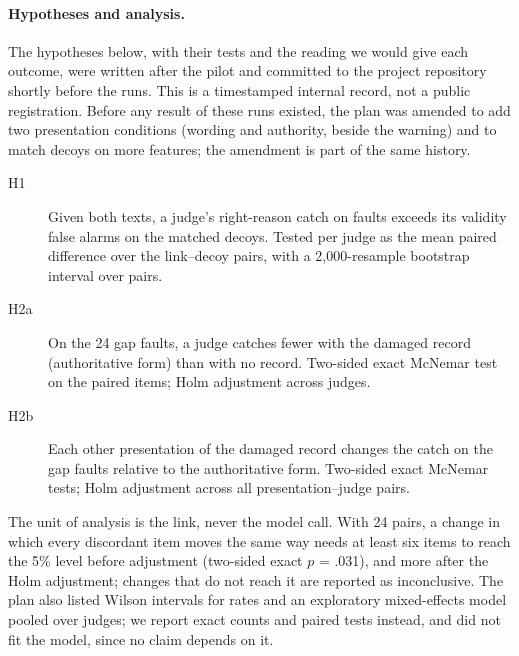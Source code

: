 \paragraph{Hypotheses and analysis.}
The hypotheses below, with their tests and the reading we would give each outcome, were written after the pilot and
committed to the project repository shortly before the runs. This is a timestamped internal record, not a public
registration. Before any result of these runs existed, the plan was amended to add two presentation conditions (wording and
authority, beside the warning) and to match decoys on more features; the amendment is part of the same history.
\begin{description}
  \item[H1] Given both texts, a judge's right-reason catch on faults exceeds its validity false alarms on the matched
  decoys. Tested per judge as the mean paired difference over the \ENLinks{} link--decoy pairs, with a 2,000-resample
  bootstrap interval over pairs.
  \item[H2a] On the 24 gap faults, a judge catches fewer with the damaged record (authoritative form) than with no
  record. Two-sided exact McNemar test on the paired items; Holm adjustment across judges.
  \item[H2b] Each other presentation of the damaged record changes the catch on the gap faults relative to the
  authoritative form. Two-sided exact McNemar tests; Holm adjustment across all \EHTwobTests{} presentation--judge
  pairs.
\end{description}
The unit of analysis is the link, never the model call. With 24 pairs, a change in which every discordant item
moves the same way needs at least six items to reach the 5\% level before adjustment (two-sided exact $p$ = .031), and
more after the Holm adjustment; changes that do not reach it are reported as inconclusive. The plan also listed Wilson
intervals for rates and an exploratory mixed-effects model pooled over judges; we report exact counts and paired tests
instead, and did not fit the model, since no claim depends on it.

